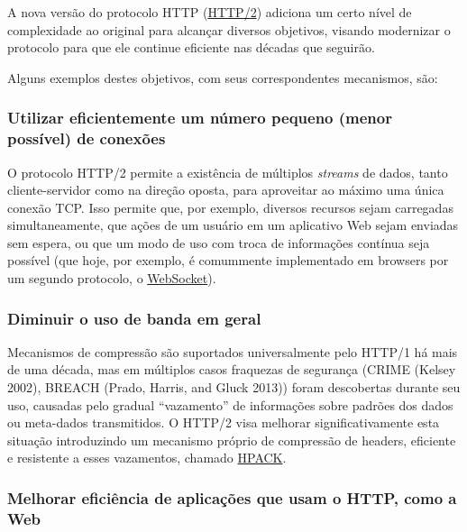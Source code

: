 \documentclass[12pt,a4paper,openright,twoside,]{abntex2}	%
\begin{document}
A nova versão do protocolo HTTP
(\href{(https://tools.ietf.org/html/rfc7540}{HTTP/2}) adiciona um certo
nível de complexidade ao original para alcançar diversos objetivos,
visando modernizar o protocolo para que ele continue eficiente nas
décadas que seguirão.

Alguns exemplos destes objetivos, com seus correspondentes mecanismos,
são:

\subsubsection{Utilizar eficientemente um número pequeno (menor
possível) de
conexões}\label{utilizar-eficientemente-um-nuxfamero-pequeno-menor-possuxedvel-de-conexuxf5es}

O protocolo HTTP/2 permite a existência de múltiplos \emph{streams} de
dados, tanto cliente-servidor como na direção oposta, para aproveitar ao
máximo uma única conexão TCP. Isso permite que, por exemplo, diversos
recursos sejam carregadas simultaneamente, que ações de um usuário em um
aplicativo Web sejam enviadas sem espera, ou que um modo de uso com
troca de informações contínua seja possível (que hoje, por exemplo, é
comummente implementado em browsers por um segundo protocolo, o
\href{https://www.websocket.org/}{WebSocket}).

\subsubsection{Diminuir o uso de banda em
geral}\label{diminuir-o-uso-de-banda-em-geral}

Mecanismos de compressão são suportados universalmente pelo HTTP/1 há
mais de uma década, mas em múltiplos casos fraquezas de segurança (CRIME
(Kelsey 2002), BREACH (Prado, Harris, and Gluck 2013)) foram descobertas
durante seu uso, causadas pelo gradual ``vazamento'' de informações
sobre padrões dos dados ou meta-dados transmitidos. O HTTP/2 visa
melhorar significativamente esta situação introduzindo um mecanismo
próprio de compressão de headers, eficiente e resistente a esses
vazamentos, chamado
\href{https://http2.github.io/http2-spec/compression.html}{HPACK}.

\subsubsection{Melhorar eficiência de aplicações que usam o HTTP, como a
Web}\label{melhorar-eficiuxeancia-de-aplicauxe7uxf5es-que-usam-o-http-como-a-web}
\end{document}
